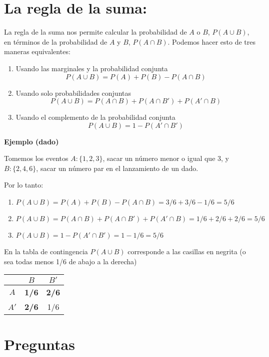 \documentclass[
]{book}
\begin{document}
\hypertarget{la-regla-de-la-suma}{%
\section{La regla de la suma:}\label{la-regla-de-la-suma}}

La regla de la suma nos permite calcular la probabilidad de \(A\) o \(B\), \(P(A \cup B)\), en términos de la probabilidad de \(A\) y \(B\), \(P(A \cap B)\). Podemos hacer esto de tres maneras equivalentes:

\begin{enumerate}
\def\labelenumi{\arabic{enumi})}
\item
  Usando las marginales y la probabilidad conjunta
  \[P(A \cup B)=P(A) + P(B) - P(A\cap B)\]
\item
  Usando solo probabilidades conjuntas
  \[P(A \cup B)=P(A \cap B)+P(A\cap B')+P(A'\cap B)\]
\item
  Usando el complemento de la probabilidad conjunta
  \[P(A \cup B)=1-P(A'\cap B')\]
\end{enumerate}

\textbf{Ejemplo (dado)}

Tomemos los eventos \(A:\{1,2,3\}\), sacar un número menor o igual que \(3\), y \(B:\{2,4,6\}\), sacar un número par en el lanzamiento de un dado.

Por lo tanto:

\begin{enumerate}
\def\labelenumi{\arabic{enumi})}
\item
  \(P(A \cup B)=P(A) + P(B) - P(A\cap B)=3/6+3/6-1/6=5/6\)
\item
  \(P(A \cup B)=P(A \cap B)+P(A\cap B')+P(A'\cap B)=1/6+2/6+2/6=5/6\)
\item
  \(P(A \cup B)=1-P(A'\cap B')= 1-1/6=5/6\)
\end{enumerate}

En la tabla de contingencia \(P(A \cup B)\) corresponde a las casillas en negrita (o sea todas menos 1/6 de abajo a la derecha)

\begin{longtable}[]{@{}ccc@{}}
\toprule
& \(B\) & \(B'\) \\
\midrule
\endhead
\(A\) & \textbf{1/6} & \textbf{2/6} \\
\(A'\) & \textbf{2/6} & 1/6 \\
\bottomrule
\end{longtable}

\hypertarget{preguntas-1}{%
\section{Preguntas}\label{preguntas-1}}
\end{document}
